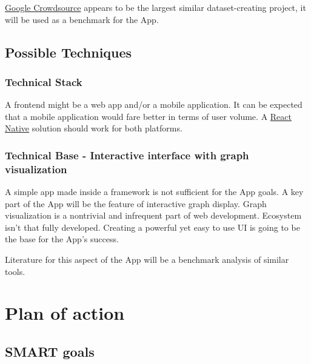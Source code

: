 \documentclass{article}
\begin{document}

\href{https://crowdsource.google.com/about/how-it-works/}{Google Crowdsource}  appears to be the largest similar dataset-creating project, it will be used as a benchmark for the App.

\subsection{Possible Techniques}\label{sec:techniques}
\subsubsection{Technical Stack}
A frontend might be a web app and/or a mobile application. It can be expected that a mobile application would fare better in terms of user volume.
A \href{https://necolas.github.io/react-native-web/}{React Native} solution should work for both platforms.

\subsubsection{Technical Base  - Interactive interface with graph visualization}
A simple app made inside a framework is not sufficient for the App goals. A key part of the App will be the feature of interactive graph display.
Graph visualization is a nontrivial and infrequent part of web development. Ecosystem isn't that fully developed. Creating a powerful yet easy to use UI is going to be the base for the App's success.

Literature for this aspect of the App will be a benchmark analysis of similar tools.

\section{Plan of action}
\subsection{SMART goals}
\end{document}
